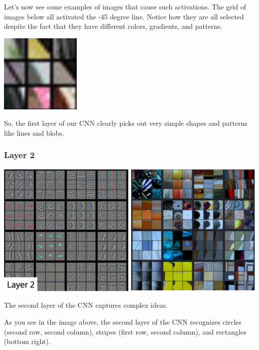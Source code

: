 Let's now see some examples of images that cause such activations. The grid of images below all activated the -45 degree line. Notice how they are all selected despite the fact that they have different colors, gradients, and patterns.

\includegraphics{img//cnn//transfer/grid-layer-1.png}

So, the first layer of our CNN clearly picks out very simple shapes and patterns like lines and blobs.

\subsubsection{Layer 2}

\includegraphics[width=1\linewidth]{img//cnn//transfer/screen-shot-2016-11-24-at-12.09.02-pm.png}

The second layer of the CNN captures complex ideas.

As you see in the image above, the second layer of the CNN recognizes circles (second row, second column), stripes (first row, second column), and rectangles (bottom right).

